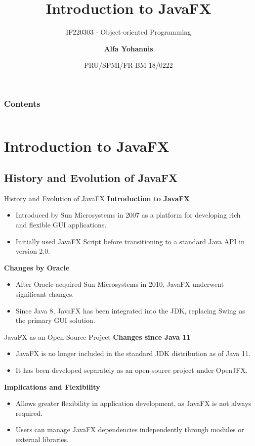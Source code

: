 \documentclass[aspectratio=169, table]{beamer}
\subtitle{IF220303 - Object-oriented Programming}
\title{\Huge Introduction to JavaFX\\\vspace{20pt}}
\date[Serial]{\scriptsize {PRU/SPMI/FR-BM-18/0222}}
\author[Pradita]{\small {\textbf{Alfa Yohannis}}}
\begin{document}
	
	\frame{\titlepage}
	
\begin{frame}[fragile]
	\frametitle{Contents}
	\vspace{10pt}
	\begin{columns}[t]
		\tableofcontents[sections={1-2}]
		
		\tableofcontents[sections={3}]
	\end{columns}
\end{frame}


\section{Introduction to JavaFX}

\subsection{History and Evolution of JavaFX}

\begin{frame}{History and Evolution of JavaFX}
	\vspace{20pt}
	\textbf{Introduction to JavaFX}
	\begin{itemize}
		\item Introduced by Sun Microsystems in 2007 as a platform for developing rich and flexible GUI applications.
		\item Initially used JavaFX Script before transitioning to a standard Java API in version 2.0.
	\end{itemize}
	
	\textbf{Changes by Oracle}
	\begin{itemize}
		\item After Oracle acquired Sun Microsystems in 2010, JavaFX underwent significant changes.
		\item Since Java 8, JavaFX has been integrated into the JDK, replacing Swing as the primary GUI solution.
	\end{itemize}
\end{frame}

\begin{frame}{JavaFX as an Open-Source Project}
	\vspace{20pt}
	\textbf{Changes since Java 11}
	\begin{itemize}
		\item JavaFX is no longer included in the standard JDK distribution as of Java 11.
		\item It has been developed separately as an open-source project under OpenJFX.
	\end{itemize}
	
	\textbf{Implications and Flexibility}
	\begin{itemize}
		\item Allows greater flexibility in application development, as JavaFX is not always required.
		\item Users can manage JavaFX dependencies independently through modules or external libraries.
	\end{itemize}
\end{frame}
\end{document}
